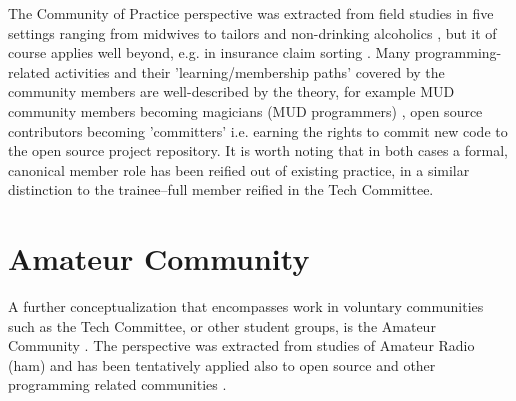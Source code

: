 \documentclass{acm_proc_article-sp}
\begin{document}
The Community of Practice perspective was extracted from field studies in five settings ranging from midwives to tailors and non-drinking alcoholics \cite{lave_wenger91}, but it of course applies well beyond, e.g. in insurance claim sorting \cite{wenger98}. Many programming-related activities and their 'learning/membership paths' covered by the community members are well-described by the theory, for example MUD community members becoming magicians (MUD programmers) \cite{pargman00, pargman05}, open source contributors becoming 'committers' i.e. earning the rights to commit new code to the open source project repository. It is worth noting that in both cases a formal, canonical member role has been reified out of existing practice, in a similar distinction to the trainee--full member reified in the Tech Committee.

\section{Amateur Community}\label{sec:amateur}
A further conceptualization that encompasses work in voluntary communities such as the Tech Committee, or other student groups, is the Amateur Community \cite{bogdan03, bogdan_bowers07}. The perspective was extracted from studies of Amateur Radio (ham) \cite{bogdan_bowers07} and has been tentatively applied also to open source and other programming related communities \cite{bogdan03}. 
\end{document}
